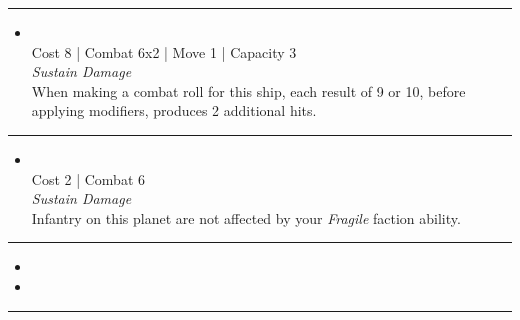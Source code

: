 \begin{multicols}{2}
\vspace{-10pt}\rule{\hsize}{0.4pt}\vspace{5pt}


\begin{itemize}
\item {}\\
Cost 8 | Combat 6x2 | Move 1 | Capacity 3 \\
\emph{Sustain Damage}\\
When making a combat roll for this ship, each result of 9 or 10, before applying modifiers, produces 2 additional hits.
\end{itemize}

\vspace{-10pt}\rule{\hsize}{0.4pt}\vspace{5pt}


\begin{itemize}
\item {}
\\
Cost 2 | Combat 6\\
\emph{Sustain Damage}\\
Infantry on this planet are not affected by your \emph{Fragile} faction ability.
\end{itemize}

\vspace{-10pt}\rule{\hsize}{0.4pt}\vspace{5pt}

\nounits

\columnbreak
{}

\begin{itemize}
\item \cylinder
\item \eres
\end{itemize}

\vspace{-10pt}\rule{\hsize}{0.4pt}\vspace{5pt}



\end{multicols}
